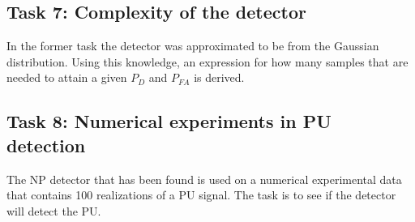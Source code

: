\subsection{Task 7: Complexity of the detector}
In the former task the detector was approximated to be from the Gaussian distribution. Using this knowledge, an expression for how many samples that are needed to attain a given $P_D$ and $P_{FA}$ is derived.

\subsection{Task 8: Numerical experiments in PU detection}
The NP detector that has been found is used on a numerical experimental data that contains 100 realizations of a PU signal. The task is to see if the detector will detect the PU.